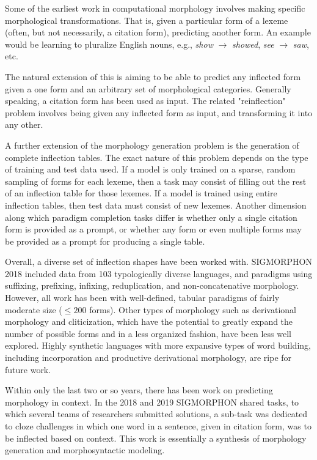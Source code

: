 Some of the earliest work in computational morphology involves making specific morphological transformations. That is, given a particular form of a lexeme (often, but not necessarily, a citation form), predicting another form. An example would be learning to pluralize English nouns, e.g., \textit{show} $\rightarrow$ \textit{showed}, \textit{see} $\rightarrow$ \textit{saw}, etc. \parencite{Dreyer2008}

The natural extension of this is aiming to be able to predict any inflected form given a one form and an arbitrary set of morphological categories. Generally speaking, a citation form has been used as input. \parencite{Durrett2013} \parencite{Faruqui2015} \parencite{Cotterell2017} The related "reinflection" problem involves being given any inflected form as input, and transforming it into any other. \parencite{Cotterell2016}

A further extension of the morphology generation problem is the generation of complete inflection tables. The exact nature of this problem depends on the type of training and test data used. If a model is only trained on a sparse, random sampling of forms for each lexeme, then a task may consist of filling out the rest of an inflection table for those lexemes. If a model is trained using entire inflection tables, then test data must consist of new lexemes. Another dimension along which paradigm completion tasks differ is whether only a single citation form is provided as a prompt, or whether any form or even multiple forms may be provided as a prompt for producing a single table. \parencite{Hulden2014} \parencite{Ahlberg2015} \parencite{Cotterell2017} 

Overall, a diverse set of inflection shapes have been worked with. SIGMORPHON 2018 included data from 103 typologically diverse languages, and paradigms using suffixing, prefixing, infixing, reduplication, and non-concatenative morphology. However, all work has been with well-defined, tabular paradigms of fairly moderate size ($\leq 200$ forms). \parencite{Cotterell2018b} Other types of morphology such as derivational morphology and cliticization, which have the potential to greatly expand the number of possible forms and in a less organized fashion, have been less well explored. Highly synthetic languages with more expansive types of word building, including incorporation and productive derivational morphology, are ripe for future work. \parencite{Cotterell2016} 

Within only the last two or so years, there has been work on predicting morphology in context. In the 2018 and 2019 SIGMORPHON shared tasks, to which several teams of researchers submitted solutions, a sub-task was dedicated to cloze challenges in which one word in a sentence, given in citation form, was to be inflected based on context. \parencite{Cotterell2018b} \parencite{McCarthy2019} This work is essentially a synthesis of morphology generation and morphosyntactic modeling.

